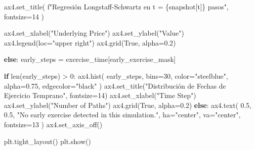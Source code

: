 \documentclass[
  11pt,
]{article}
\newenvironment{Shaded}{}{}
\newcommand{\BuiltInTok}[1]{\textcolor[rgb]{0.00,0.50,0.00}{#1}}
\newcommand{\ControlFlowTok}[1]{\textcolor[rgb]{0.00,0.44,0.13}{\textbf{#1}}}
\newcommand{\DecValTok}[1]{\textcolor[rgb]{0.25,0.63,0.44}{#1}}
\newcommand{\FloatTok}[1]{\textcolor[rgb]{0.25,0.63,0.44}{#1}}
\newcommand{\NormalTok}[1]{#1}
\newcommand{\OperatorTok}[1]{\textcolor[rgb]{0.40,0.40,0.40}{#1}}
\newcommand{\SpecialCharTok}[1]{\textcolor[rgb]{0.25,0.44,0.63}{#1}}
\newcommand{\SpecialStringTok}[1]{\textcolor[rgb]{0.73,0.40,0.53}{#1}}
\newcommand{\StringTok}[1]{\textcolor[rgb]{0.25,0.44,0.63}{#1}}
\newcommand{\VariableTok}[1]{\textcolor[rgb]{0.10,0.09,0.49}{#1}}
\begin{document}
\begin{Shaded}
\begin{Highlighting}[]
\NormalTok{    ax4.set\_title(}
        \SpecialStringTok{f"Regresión Longstaff{-}Schwartz en t = }\SpecialCharTok{\{}\NormalTok{snapshot[}\StringTok{\textquotesingle{}t\textquotesingle{}}\NormalTok{]}\SpecialCharTok{\}}\SpecialStringTok{ pasos"}\NormalTok{,}
\NormalTok{        fontsize}\OperatorTok{=}\DecValTok{14}
\NormalTok{    )}

\NormalTok{    ax4.set\_xlabel(}\StringTok{"Underlying Price"}\NormalTok{)}
\NormalTok{    ax4.set\_ylabel(}\StringTok{"Value"}\NormalTok{)}
\NormalTok{    ax4.legend(loc}\OperatorTok{=}\StringTok{"upper right"}\NormalTok{)}
\NormalTok{    ax4.grid(}\VariableTok{True}\NormalTok{, alpha}\OperatorTok{=}\FloatTok{0.2}\NormalTok{)}

\ControlFlowTok{else}\NormalTok{:}
\NormalTok{    early\_steps }\OperatorTok{=}\NormalTok{ exercise\_time[early\_exercise\_mask]}

    \ControlFlowTok{if} \BuiltInTok{len}\NormalTok{(early\_steps) }\OperatorTok{\textgreater{}} \DecValTok{0}\NormalTok{:}
\NormalTok{        ax4.hist(}
\NormalTok{            early\_steps,}
\NormalTok{            bins}\OperatorTok{=}\DecValTok{30}\NormalTok{,}
\NormalTok{            color}\OperatorTok{=}\StringTok{"steelblue"}\NormalTok{,}
\NormalTok{            alpha}\OperatorTok{=}\FloatTok{0.75}\NormalTok{,}
\NormalTok{            edgecolor}\OperatorTok{=}\StringTok{"black"}
\NormalTok{        )}
\NormalTok{        ax4.set\_title(}\StringTok{"Distribución de Fechas de Ejercicio Temprano"}\NormalTok{, fontsize}\OperatorTok{=}\DecValTok{14}\NormalTok{)}
\NormalTok{        ax4.set\_xlabel(}\StringTok{"Time Step"}\NormalTok{)}
\NormalTok{        ax4.set\_ylabel(}\StringTok{"Number of Paths"}\NormalTok{)}
\NormalTok{        ax4.grid(}\VariableTok{True}\NormalTok{, alpha}\OperatorTok{=}\FloatTok{0.2}\NormalTok{)}
    \ControlFlowTok{else}\NormalTok{:}
\NormalTok{        ax4.text(}
            \FloatTok{0.5}\NormalTok{,}
            \FloatTok{0.5}\NormalTok{,}
            \StringTok{"No early exercise detected in this simulation."}\NormalTok{,}
\NormalTok{            ha}\OperatorTok{=}\StringTok{"center"}\NormalTok{,}
\NormalTok{            va}\OperatorTok{=}\StringTok{"center"}\NormalTok{,}
\NormalTok{            fontsize}\OperatorTok{=}\DecValTok{13}
\NormalTok{        )}
\NormalTok{        ax4.set\_axis\_off()}

\NormalTok{plt.tight\_layout()}
\NormalTok{plt.show()}


\end{Highlighting}
\end{Shaded}
\end{document}
